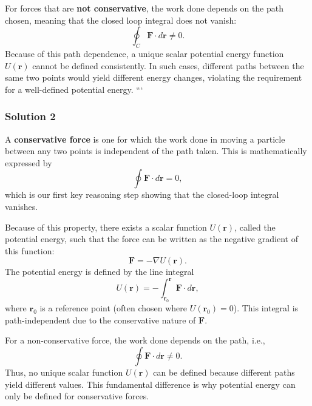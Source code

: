 \documentclass{article}
\begin{document}
For forces that are \textbf{not conservative}, the work done depends on the path chosen, meaning that the closed loop integral does not vanish:
\[
\oint_C \mathbf{F}\cdot d\mathbf{r} \neq 0.
\]
Because of this path dependence, a unique scalar potential energy function \(U(\mathbf{r})\) cannot be defined consistently. In such cases, different paths between the same two points would yield different energy changes, violating the requirement for a well-defined potential energy.
```

\subsubsection{Solution 2}

A \textbf{conservative force} is one for which the work done in moving a particle between any two points is independent of the path taken. This is mathematically expressed by
\[
\oint \mathbf{F}\cdot d\mathbf{r} = 0,
\]
which is our first key reasoning step showing that the closed-loop integral vanishes.

Because of this property, there exists a scalar function \( U(\mathbf{r}) \), called the potential energy, such that the force can be written as the negative gradient of this function:
\[
\mathbf{F} = -\nabla U(\mathbf{r}).
\]
The potential energy is defined by the line integral
\[
U(\mathbf{r}) = -\int_{\mathbf{r}_0}^{\mathbf{r}} \mathbf{F}\cdot d\mathbf{r},
\]
where \(\mathbf{r}_0\) is a reference point (often chosen where \( U(\mathbf{r}_0) = 0 \)). This integral is path-independent due to the conservative nature of \(\mathbf{F}\).

For a non-conservative force, the work done depends on the path, i.e.,
\[
\oint \mathbf{F}\cdot d\mathbf{r} \neq 0.
\]
Thus, no unique scalar function \( U(\mathbf{r}) \) can be defined because different paths yield different values. This fundamental difference is why potential energy can only be defined for conservative forces.
\end{document}
